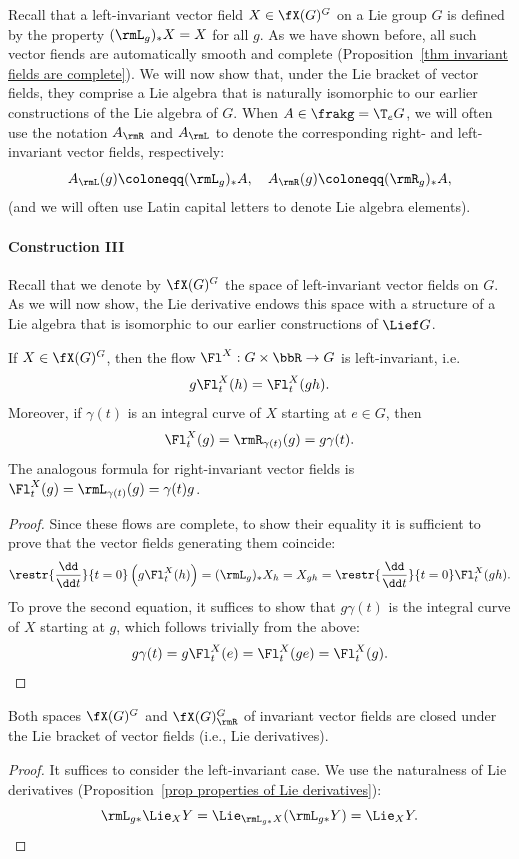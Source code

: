 Recall that a left-invariant vector field $X\in\fX(G)^G$ on a Lie group $G$ is defined by the property $(\rmL_g)_\ast X=X$ for all $g$. As we have shown before, all such vector fiends are automatically smooth and complete (Proposition~\ref{thm invariant fields are complete}). We will now show that, under the Lie bracket of vector fields, they comprise a Lie algebra that is naturally isomorphic to our earlier constructions of the Lie algebra of $G$. When $A\in\frakg=\T_eG$, we will often use the notation $A_\rmR$ and $A_\rmL$ to denote the corresponding right- and left-invariant vector fields, respectively:
\[A_\rmL(g)\coloneqq (\rmL_g)_\ast A,\quad A_\rmR(g)\coloneqq (\rmR_g)_\ast A,\]
(and we will often use Latin capital letters to denote Lie algebra elements).

\paragraph{Construction III} Recall that we denote by $\fX(G)^G$ the space of left-invariant vector fields on $G$. As we will now show, the Lie derivative endows this space with a structure of a Lie algebra that is isomorphic to our earlier constructions of $\Lief G$.

\begin{lem}\label{lem 471841}
    If $X\in\fX(G)^G$, then the flow $\Fl^X:G\times \bbR \to G$ is left-invariant, i.e.
    \[g\Fl^X_t(h)=\Fl^X_t(gh).\]
    Moreover, if $\gamma(t)$ is an integral curve of $X$ starting at $e\in G$, then
    \[\Fl^X_t(g)=\rmR_{\gamma(t)}(g)=g\gamma(t).\]
    The analogous formula for right-invariant vector fields is $\Fl^X_t(g)=\rmL_{\gamma(t)}(g)=\gamma(t)g$.
\end{lem}
\begin{proof}
    Since these flows are complete, to show their equality it is sufficient to prove that the vector fields generating them coincide:
    \[\restr{\frac{\dd}{\dd t}}{t=0}\left(g\Fl^X_t(h)\right)=(\rmL_g)_{\ast}X_{h}=X_{gh}=\restr{\frac{\dd}{\dd t}}{t=0} \Fl^X_t(gh).\]
    To prove the second equation, it suffices to show that $g\gamma(t)$ is the integral curve of $X$ starting at $g$, which follows trivially from the above:
    \[g\gamma(t)=g \Fl^X_t(e)=\Fl^X_t(ge)=\Fl^X_t(g).\]
\end{proof}


\begin{lem}
    Both spaces $\fX(G)^G$ and $\fX(G)^G_\rmR$ of invariant vector fields are closed under the Lie bracket of vector fields (i.e., Lie derivatives).
\end{lem}
\begin{proof}
    It suffices to consider the left-invariant case. We use the naturalness of Lie derivatives (Proposition~\ref{prop properties of Lie derivatives}):
    \[\rmL_{g\ast} \Lie_X Y=\Lie_{\rmL_{g\ast}X}(\rmL_{g\ast} Y)=\Lie_X Y.\]
\end{proof}

